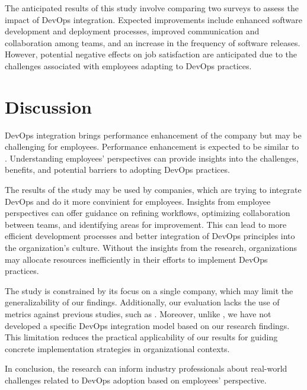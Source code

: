 \documentclass[oneside,final,12pt,a4paper]{extreport}
\begin{document}
The anticipated results of this study involve comparing two surveys to assess the impact of DevOps integration. Expected improvements include enhanced software development and deployment processes, improved communication and collaboration among teams, and an increase in the frequency of software releases. However, potential negative effects on job satisfaction are anticipated due to the challenges associated with employees adapting to DevOps practices.

\section{Discussion}

DevOps integration brings performance enhancement of the company but may be challenging for employees. Performance enhancement is expected to be similar to \cite{21}. Understanding employees' perspectives can provide insights into the challenges, benefits, and potential barriers to adopting DevOps practices. 

The results of the study may be used by companies, which are trying to integrate DevOps and do it more convinient for employees. Insights from employee perspectives can offer guidance on refining workflows, optimizing collaboration between teams, and identifying areas for improvement. This can lead to more efficient development processes and better integration of DevOps principles into the organization's culture. Without the insights from the research, organizations may allocate resources inefficiently in their efforts to implement DevOps practices. 

The study is constrained by its focus on a single company, which may limit the generalizability of our findings. Additionally, our evaluation lacks the use of metrics against previous studies, such as \cite{15}. Moreover, unlike \cite{16}, we have not developed a specific DevOps integration model based on our research findings. This limitation reduces the practical applicability of our results for guiding concrete implementation strategies in organizational contexts.

In conclusion, the research can inform industry professionals about real-world challenges related to DevOps adoption based on employees' perspective. 


\newpage
\printbibliography[heading=bibintoc,title={References}]
\end{document}
